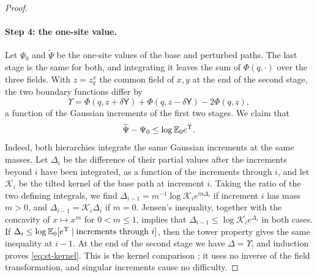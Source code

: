 \begin{proof}
\paragraph{Step 4: the one-site value.} Let $\Psi_0$ and $\widetilde\Psi$ be the one-site values of the base and perturbed paths. The last stage is the same for both, and integrating it leaves the sum of $\Phi(q,\cdot)$ over the three fields. With $z=z^x_q$ the common field of $x,y$ at the end of the second stage, the two boundary functions differ by
\[
 \Upsilon=\Phi(q,z+\delta\mathsf Y)+\Phi(q,z-\delta\mathsf Y)-2\Phi(q,z),
\]
a function of the Gaussian increments of the first two stages. We claim that
\begin{equation}\label{eq:st-kernel}
 \widetilde\Psi-\Psi_0\le\log\mathbb E_0e^{\Upsilon}.
\end{equation}
Indeed, both hierarchies integrate the same Gaussian increments at the same masses. Let $\Delta_i$ be the difference of their partial values after the increments beyond $i$ have been integrated, as a function of the increments through $i$, and let $\mathcal K_i$ be the tilted kernel of the base path at increment $i$. Taking the ratio of the two defining integrals, we find $\Delta_{i-1}=m^{-1}\log\mathcal K_ie^{m\Delta_i}$ if increment $i$ has mass $m>0$, and $\Delta_{i-1}=\mathcal K_i\Delta_i$ if $m=0$. Jensen's inequality, together with the concavity of $x\mapsto x^m$ for $0<m\le1$, implies that $\Delta_{i-1}\le\log\mathcal K_ie^{\Delta_i}$ in both cases. If $\Delta_i\le\log\mathbb E_0[e^\Upsilon\mid\text{increments through }i]$, then the tower property gives the same inequality at $i-1$. At the end of the second stage we have $\Delta=\Upsilon$, and induction proves \eqref{eq:st-kernel}. This is the kernel comparison \cite[(4.11), (7.17)]{oai-barriers}; it uses no inverse of the field transformation, and singular increments cause no difficulty.


\end{proof}

